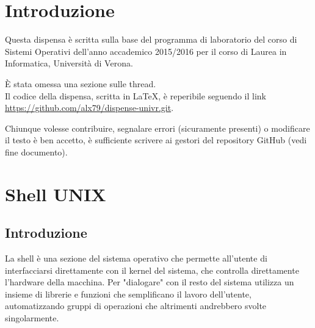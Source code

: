 \documentclass[a4paper, 10pt]{article}
\begin{document}
		\begin{frontespizio}
	\end{frontespizio}
\hypersetup{hidelinks, colorlinks = true, linkcolor = black}
\pagestyle{fancy}
\newpage
{}
\tableofcontents
\newpage
{}

\section{Introduzione}
Questa dispensa è scritta sulla base del programma di laboratorio del corso di Sistemi Operativi dell'anno accademico 2015/2016 per il corso di Laurea in Informatica, Università di Verona.

È stata omessa una sezione sulle thread.\\

Il codice della dispensa, scritta in \LaTeX, è reperibile seguendo il link \url{https://github.com/alx79/dispense-univr.git}.

Chiunque volesse contribuire, segnalare errori (sicuramente presenti) o modificare il testo è ben accetto, è sufficiente scrivere ai gestori del repository GitHub (vedi fine documento).


\section{Shell UNIX}
\subsection{Introduzione}
La shell è una sezione del sistema operativo che permette all'utente di interfacciarsi direttamente con il kernel del sistema, che controlla direttamente l'hardware della macchina.
Per "dialogare" con il resto del sistema utilizza un insieme di librerie e funzioni che semplificano il lavoro dell'utente, automatizzando gruppi di operazioni che altrimenti andrebbero svolte singolarmente.
\end{document}
